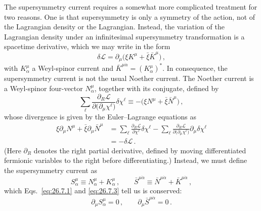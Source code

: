 The supersymmetry current requires a somewhat more complicated treatment for
two reasons. One is that supersymmetry is only a symmetry of the action, not
of the Lagrangian density or the Lagrangian. Instead, the variation of the
Lagrangian density under an infinitesimal supersymmetry transformation is a
spacetime derivative, which we may write in the form
\begin{equation}
  \delta\mathcal{L}
  =\partial_\mu\bigl(\xi K^\mu+\bar\xi\bar K^\mu\bigr)\,,
  \tag{26.7.1}\label{eq:26.7.1}
\end{equation}
with \(K^\mu_\alpha\) a Weyl-spinor current and
\(\bar K^{\mu\dot\alpha}=(K^\mu_\alpha)^*\). In consequence, the
supersymmetry current is not the usual Noether current. The Noether current is
a Weyl-spinor four-vector \(N^\mu_\alpha\), together with its conjugate,
defined by
\begin{equation}
  \sum_\ell
  \frac{\partial_R\mathcal{L}}
       {\partial\bigl(\partial_\mu\chi^\ell\bigr)}
  \delta\chi^\ell
  \equiv-\bigl(\xi N^\mu+\bar\xi\bar N^\mu\bigr)\,,
  \tag{26.7.2}\label{eq:26.7.2}
\end{equation}
whose divergence is given by the Euler--Lagrange equations as
\begin{equation}
  \begin{aligned}
  \xi\partial_\mu N^\mu+\bar\xi\partial_\mu\bar N^\mu
  &=
  \sum_\ell\frac{\partial_R\mathcal{L}}{\partial\chi^\ell}
  \delta\chi^\ell
  -\sum_\ell
  \frac{\partial_R\mathcal{L}}
       {\partial\bigl(\partial_\mu\chi^\ell\bigr)}
  \partial_\mu\delta\chi^\ell
  \\
  &=-\delta\mathcal{L}\,.
  \end{aligned}
  \tag{26.7.3}\label{eq:26.7.3}
\end{equation}
(Here \(\partial_R\) denotes the right partial derivative, defined by moving
differentiated fermionic variables to the right before differentiating.)
Instead, we must define the supersymmetry current as
\begin{equation}
  S^\mu_\alpha\equiv N^\mu_\alpha+K^\mu_\alpha\,,
  \qquad
  \bar S^{\mu\dot\alpha}\equiv
  \bar N^{\mu\dot\alpha}+\bar K^{\mu\dot\alpha}\,,
  \tag{26.7.4}\label{eq:26.7.4}
\end{equation}
which Eqs.~\eqref{eq:26.7.1} and \eqref{eq:26.7.3} tell us is conserved:
\begin{equation}
  \partial_\mu S^\mu_\alpha=0\,,
  \qquad
  \partial_\mu\bar S^{\mu\dot\alpha}=0\,.
  \tag{26.7.5}\label{eq:26.7.5}
\end{equation}

